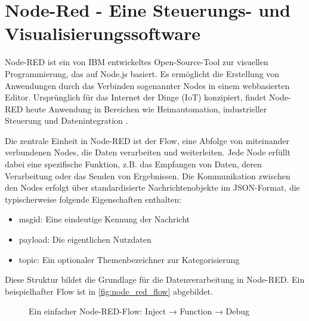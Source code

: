 \section{Node-Red - Eine Steuerungs- und Visualisierungssoftware}

Node-RED ist ein von IBM entwickeltes Open-Source-Tool zur visuellen Programmierung, das auf Node.js basiert. Es ermöglicht die Erstellung von Anwendungen durch das Verbinden sogenannter Nodes in einem webbasierten Editor. Ursprünglich für das Internet der Dinge (IoT) konzipiert, findet Node-RED heute Anwendung in Bereichen wie Heimautomation, industrieller Steuerung und Datenintegration \autocite{nodered_official}. 

Die zentrale Einheit in Node-RED ist der Flow, eine Abfolge von miteinander verbundenen Nodes, die Daten verarbeiten und weiterleiten. Jede Node erfüllt dabei eine spezifische Funktion, z.B. das Empfangen von Daten, deren Verarbeitung oder das Senden von Ergebnissen. Die Kommunikation zwischen den Nodes erfolgt über standardisierte Nachrichtenobjekte im JSON-Format, die typischerweise folgende Eigenschaften enthalten:

\begin{itemize}
	
	\item msgid: Eine eindeutige Kennung der Nachricht
	
	\item payload: Die eigentlichen Nutzdaten
	
	\item topic: Ein optionaler Themenbezeichner zur Kategorisierung	

\end{itemize}

Diese Struktur bildet die Grundlage für die Datenverarbeitung in Node-RED. Ein beispielhafter Flow ist in \autoref{fig:node_red_flow} abgebildet.

\begin{figure}[H]
	\centering
	\caption{Ein einfacher Node-RED-Flow: Inject → Function → Debug}
	\label{fig:node_red_flow}
\end{figure}

